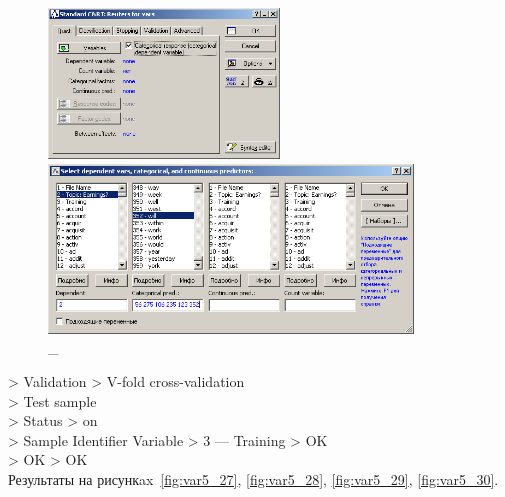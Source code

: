 \begin{figure}[!h]
  \centering

  \begin{minipage}{0.29\textwidth}
    \centering

    \includegraphics[height=4cm]
    {inc/var5/25.PNG}

    \caption{\_}

    \label{fig:var5_25}
  \end{minipage}
  \begin{minipage}{0.69\textwidth}
    \centering

    \includegraphics[height=4.5cm]
    {inc/var5/26.PNG}

    \caption{\_}

    \label{fig:var5_26}
  \end{minipage}
\end{figure}

> Validation > V-fold cross-validation \\
> Test sample \\
> Status > on \\
> Sample Identifier Variable > 3 — Training > OK \\
> OK > OK \\

Результаты на рисункax~\ref{fig:var5_27}, \ref{fig:var5_28}, \ref{fig:var5_29}, \ref{fig:var5_30}.

